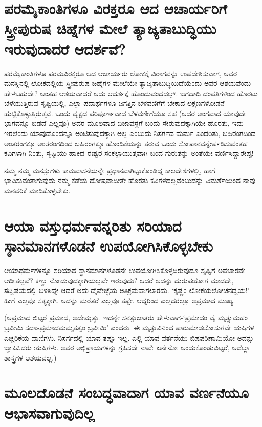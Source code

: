 \section*{ಪರಮೈಕಾಂತಿಗಳೂ ವಿರಕ್ತರೂ ಆದ ಆಚಾರ್ಯರಿಗೆ  ಸ್ತ್ರೀಪುರುಷ ಚಿಹ್ನೆಗಳ ಮೇಲೆ ತ್ಯಾಜ್ಯತಾಬುದ್ಧಿಯು ಇರುವುದಾದರೆ ಆದರ್ಶವೆ?}

ಪರಮೈಕಾಂತಿಗಳೂ ಪರಮವಿರಕ್ತರೂ ಆದ ಆಚಾರ್ಯರು ಲೋಕಕ್ಕೆ ವಿರಾಗವನ್ನು ಉಪದೇಶಿಸುವಾಗ, ಅವರ ಮನಸ್ಸಿನಲ್ಲಿ ಲೋಕದಲ್ಲಿಯ ಸ್ತ್ರೀಪುರುಷ ಚಿಹ್ನೆಗಳ ಮೇಲೆಯೇ ತ್ಯಾಜ್ಯತಾಬುದ್ಧಿಯಿದೆಯೆಂದು ಅವರ ಆಶಯವೆಂದು ಹೇಳಬಹುದೇ? ಅಂತಹ ಆಶಯವಾದರೆ ಅದು ಆದರ್ಶಕ್ಕೆ ಹೊಂದುವಂಥದಲ್ಲ್. ಜಗದಾದಿ ದಂಪತಿಗಳಿಂದ ಹೊರಟು ಬೆಳೆಯುತ್ತಿರುವ ಸೃಷ್ಟಿಯಲ್ಲಿ, ಎಲ್ಲಾ ಪದಾರ್ಥಗಳೂ ಜಗತ್ತಿನ ಬೆಳವಣಿಗೆಗೆ ಬೇಕಾದ ಲಕ್ಷಣಗಳೋಡನೆ ಹುಟ್ಟಿಕೊಳ್ಳುತ್ತಿರುತ್ತವೆ. ಒಂದು ವೃಕ್ಷದ ಪರಿಪೂರ್ಣವಾದ ಬೆಳವಣೀಗೆಯೂ ಸಹ (ಅದರ ಅಂಗವಾದ ಯಾವುದೇ ಭಾಗವನ್ನೂ ಬಿಡದೆ ಎಲ್ಲವೂ) ಅದರ ಮೂಲವಾದ ಬಿಜಾವಸ್ಥೆಗೆ ಬಂದು ಸೇರುವುದಕ್ಕಾಗಿಯೇ ಹೊರತು, ಇದು ಇರಲೆಂದು ಯಾವುದೊಂದನ್ನೂ ಅಂಟಿಸುವುದಕ್ಕಾಗಿ ಅಲ್ಲ ಎಂಬುದು ನಿಸರ್ಗದ ಮರ್ಮ ಎಂದರಿತು, ಬಹಿರಂಗದಿಂದ ಅಂತರಂಗಕ್ಕೂ ಅಂತರಂಗದಿಂದ ಬಹಿರಂಗಕ್ಕೂ ಹೊಂದಿಕೆಯನ್ನು ತರುವ ಒಂದು ಸೋಪಾನವನ್ನೇರ್ಪಡಿಸುವಂತಹ ಕವಿಗಳಾಗಿ ನಿಂತು, ಸೃಷ್ಟಿಯು ಹಾಕಿದ ಈಶ್ವರ ಸಂಕಲ್ಪಾಯುತ್ತವಾಗಿ ಬಂದ ಗುರುತನ್ನು ಅಂತೆಯೇ ವರ್ಣಿಸಿದ್ದಾರೇಪ್ಪ!

ನಮ್ಮ ನಮ್ಮ ಮನಸ್ಸುಗಳು ಕಾಮವಾಸನೆಯನ್ನೇ ಪ್ರಧಾನವಾಗಿಟ್ಟುಕೊಂಡಿದ್ದ ಕಾಲದೇಶಗಳಲ್ಲಿ, ಹಾಗೆ ಭಾವಿಸುವಂತಾಗುವುದು ನಮ್ಮ ಕಡೆಯ ದೋಷವಾದೀತೇ ಹೊರತು ಕವಿಗಳದಲ್ಲವೆಂಬುದನ್ನು ವಿಮರ್ಶೆಯಿಂದ ನಾವು ಮನವರಿಕೆ ಮಾಡಿಕೊಳ್ಳಬೇಕು.

\section*{ಆಯಾ ವಸ್ತುಧರ್ಮವನ್ನರಿತು ಸರಿಯಾದ ಸ್ಠಾನಮಾನಗಳೊಡನೆ ಉಪಯೋಗಿಸಿಕೊಳ್ಳಬೇಕು}

ಆಯಾಧರ್ಮಗಳನ್ನೂ ಸರಿಯಾದ ಸ್ಥಾನಮಾನಗಳೊಡನೇ ಉಪಯೋಗಿಸಿಕೊಳ್ಳದಿರುವುದೂ ಸೃಷ್ಟಿಗೆ ಅಪಚಾರವೇ ಆದೀತಲ್ಲವೆ? ಕಣ್ಣು ನೋಡುವುದಕ್ಕಾಗಿಯಲ್ಲವೇ ಇರುವುದು? ಆದರೆ ಅದನ್ನು ದುರುಪಯೋಗ ಮಾಡದೇ, ಸದ್ವಿಷಯದಲ್ಲಿ ಬಳಸಿದ್ದೇ ಆದರೆ ಅದು ದೈವೇಚ್ಛೆಯ ಅತಿಕ್ರಮವಾಗಲಾರದು. `ಕೃಷ್ಣಂ ಲೋಕಯಲೋಚನದ್ವಯ!' ಹೀಗೆ ಎಲ್ಲವೂ ಸತ್ಯಕ್ಕಾಗಿ. ಅದನ್ನು ಮರೆತರೆ ಎಲ್ಲವೂ ತಪ್ಪೇ. ಆದ್ದರಿಂದ ಎಲ್ಲದರಲ್ಲೂ ಅಪ್ರಮಾದ ಮುಖ್ಯ.

(ಅಪ್ರಮಾದ ಬಿಟ್ಟರೆ ಪ್ರಮಾದ, ಅದೇಮೃತ್ಯು. ಇದನ್ನೇ ಸನತ್ಸುಜಾತರು ಹೇಳುವಾಗ-`ಪ್ರಮಾದಂ ವೈ ಮೃತ್ಯುಮಹಂ\label{126} ಬ್ರವೀಮಿ ಸದಾಽಪ್ರಮಾದಮಮೃತತ್ವಂ ಬ್ರವೀಮಿ' ಎಂದರು. ಈ ಮೃತ್ಯುವಿನಿಂದ ಪಾರುಮಾಡಲೋಸುಗವೇ ಋಷಿಗಳ ಎಚ್ಚರಿಕೆಯ ವಾಣಿಗಳು. ನಿಸರ್ಗದಲ್ಲಿ ಯಾವ ತಪ್ಪೂ ಇಲ್ಲ. ಎಲ್ಲಿ ಯಾವ ವರ್ತನೆಯು ಬಿಷಪರಿಣಾಮಿಯೋ ಅದನ್ನು ಜ್ಞಾಪಿಸಿದರು ಋಷಿಗಳು. ಅವರ ಅಭಿಪ್ರಾಯಗಳನ್ನು ಗ್ರಹಿಸದೇ ನಾವೇ ಏನೇನೋ ಅಂದುಕೊಂಡುಬಿಟ್ಟರೆ, ಅದೆಲ್ಲಾ ಶಾಸ್ತ್ರಗಳ ಆಶಯವಲ್ಲ.)

\section*{ಮೂಲದೊಡನೆ ಸಂಬದ್ಧವಾದಾಗ ಯಾವ ವರ್ಣನೆಯೂ ಆಭಾಸವಾಗುವುದಿಲ್ಲ}

